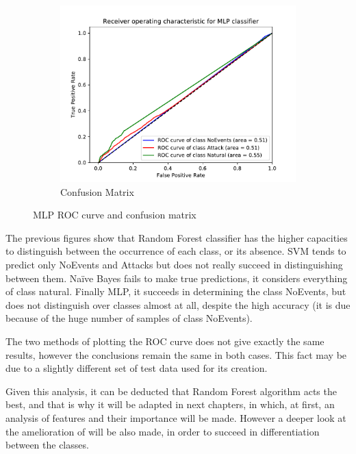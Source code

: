 \begin{figure}[H]
\begin{subfigure}[t]{0.3\textwidth}
        \includegraphics[page=2, width=\linewidth, trim= 0 50 0 100, clip]{images/results_scikit/MLP}
        \caption{Confusion Matrix}
        \label{fig:scikit_MLP_CM}
    \end{subfigure}
    \caption{MLP ROC curve and confusion matrix}
    \label{fig:ROCCM_MLP}
\end{figure}

The previous figures show that Random Forest classifier has the higher capacities to distinguish between the occurrence of each class, or its absence. SVM tends to predict only NoEvents and Attacks but does not really succeed in distinguishing between them. Naïve Bayes fails to make true predictions, it considers everything of class natural. Finally MLP, it succeeds in determining the class NoEvents, but does not distinguish over classes almost at all, despite the high accuracy (it is due because of the huge number of samples of class NoEvents).

The two methods of plotting the ROC curve does not give exactly the same results, however the conclusions remain the same in both cases. This fact may be due to a slightly different set of test data used for its creation.

Given this analysis, it can be deducted that Random Forest algorithm acts the best, and that is why it will be adapted in next chapters, in which, at first, an analysis of features and their importance will be made. However a deeper look at the amelioration of  will be also made, in order to succeed in differentiation between the classes.

